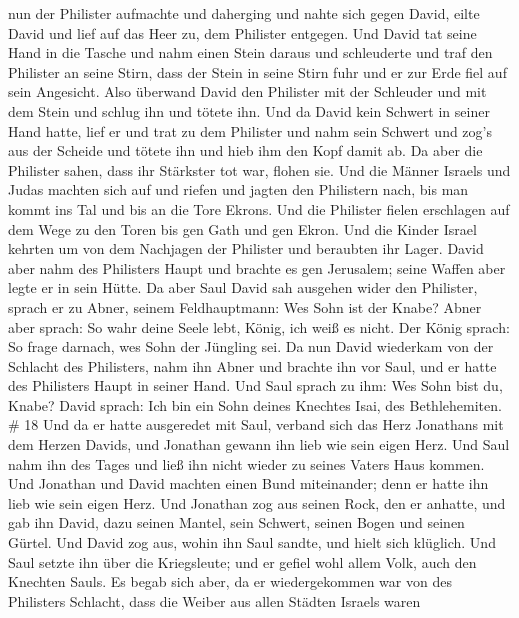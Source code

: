 nun der Philister aufmachte und daherging und nahte sich gegen David,
eilte David und lief auf das Heer zu, dem Philister entgegen.
 Und David tat seine Hand in die Tasche und nahm einen
Stein daraus und schleuderte und traf den Philister an seine Stirn, dass
der Stein in seine Stirn fuhr und er zur Erde fiel auf sein Angesicht.
 Also überwand David den Philister mit der Schleuder und
mit dem Stein und schlug ihn und tötete ihn. Und da David kein Schwert
in seiner Hand hatte,  lief er und trat zu dem Philister
und nahm sein Schwert und zog's aus der Scheide und tötete ihn und hieb
ihm den Kopf damit ab. Da aber die Philister sahen, dass ihr Stärkster
tot war, flohen sie.  Und die Männer Israels und Judas
machten sich auf und riefen und jagten den Philistern nach, bis man
kommt ins Tal und bis an die Tore Ekrons. Und die Philister fielen
erschlagen auf dem Wege zu den Toren bis gen Gath und gen Ekron.
 Und die Kinder Israel kehrten um von dem Nachjagen der
Philister und beraubten ihr Lager.  David aber nahm des
Philisters Haupt und brachte es gen Jerusalem; seine Waffen aber legte
er in sein Hütte.  Da aber Saul David sah ausgehen wider
den Philister, sprach er zu Abner, seinem Feldhauptmann: Wes Sohn ist
der Knabe? Abner aber sprach: So wahr deine Seele lebt, König, ich weiß
es nicht.  Der König sprach: So frage darnach, wes Sohn der
Jüngling sei.  Da nun David wiederkam von der Schlacht des
Philisters, nahm ihn Abner und brachte ihn vor Saul, und er hatte des
Philisters Haupt in seiner Hand.  Und Saul sprach zu ihm:
Wes Sohn bist du, Knabe? David sprach: Ich bin ein Sohn deines Knechtes
Isai, des Bethlehemiten. \# 18  Und da er hatte ausgeredet
mit Saul, verband sich das Herz Jonathans mit dem Herzen Davids, und
Jonathan gewann ihn lieb wie sein eigen Herz.  Und Saul nahm
ihn des Tages und ließ ihn nicht wieder zu seines Vaters Haus kommen.
 Und Jonathan und David machten einen Bund miteinander; denn
er hatte ihn lieb wie sein eigen Herz.  Und Jonathan zog aus
seinen Rock, den er anhatte, und gab ihn David, dazu seinen Mantel, sein
Schwert, seinen Bogen und seinen Gürtel.  Und David zog aus,
wohin ihn Saul sandte, und hielt sich klüglich. Und Saul setzte ihn über
die Kriegsleute; und er gefiel wohl allem Volk, auch den Knechten Sauls.
 Es begab sich aber, da er wiedergekommen war von des
Philisters Schlacht, dass die Weiber aus allen Städten Israels waren
